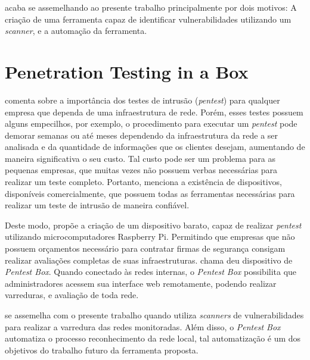  acaba se assemelhando ao presente trabalho principalmente por dois motivos: A criação de uma ferramenta capaz de identificar vulnerabilidades utilizando um \textit{scanner},  e a automação da ferramenta.

\section{Penetration Testing in a Box}
 comenta sobre a importância dos testes de intrusão (\textit{pentest}) para qualquer empresa que dependa de uma infraestrutura de rede. Porém, esses testes possuem alguns empecilhos, por exemplo, o procedimento para executar um \textit{\gls{pentest}} pode demorar semanas ou até meses dependendo da infraestrutura da rede a ser analisada e da quantidade de informações que os clientes desejam, aumentando de maneira significativa o seu custo. Tal custo pode ser um problema para as pequenas empresas, que muitas vezes não possuem verbas necessárias para realizar um teste completo. Portanto,  menciona a existência de dispositivos, disponíveis comercialmente, que possuem todas as ferramentas necessárias para realizar um teste de intrusão de maneira confiável.


Deste modo,  propõe a criação de um dispositivo barato, capaz de realizar \textit{\gls{pentest}} utilizando microcomputadores Raspberry Pi\cite{raspberry}. Permitindo que empresas que não possuem orçamentos necessário para contratar firmas de segurança consigam realizar avaliações completas de suas infraestruturas.  chama deu dispositivo de \textit{Pentest Box}. Quando conectado às redes internas, o \textit{Pentest Box} possibilita que administradores acessem sua interface web remotamente, podendo realizar varreduras, e avaliação de toda rede.

 se assemelha com o presente trabalho quando utiliza \textit{scanners} de vulnerabilidades para realizar a varredura das redes monitoradas. Além disso, o \textit{Pentest Box} automatiza o processo reconhecimento da rede local, tal automatização é um dos objetivos do trabalho futuro da ferramenta proposta.
 
